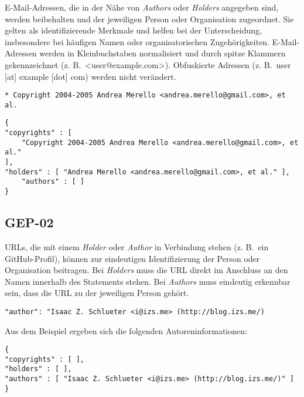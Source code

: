 E-Mail-Adressen, die in der Nähe von \textit{Authors} oder \textit{Holders} angegeben sind, werden beibehalten und der jeweiligen Person oder Organisation zugeordnet.
Sie gelten als identifizierende Merkmale und helfen bei der Unterscheidung, insbesondere bei häufigen Namen oder organisatorischen Zugehörigkeiten.
E-Mail-Adressen werden in Kleinbuchstaben normalisiert und durch spitze Klammern gekennzeichnet (z. B.\ <user@example.com>).
Obfuskierte Adressen (z. B.\ user [at] example [dot] com) werden nicht verändert.

\begin{lstlisting}[keepspaces=true]
* Copyright 2004-2005 Andrea Merello <andrea.merello@gmail.com>, et al.
\end{lstlisting}

\begin{lstlisting}[keepspaces=true]
{
"copyrights" : [
    "Copyright 2004-2005 Andrea Merello <andrea.merello@gmail.com>, et al."
],
"holders" : [ "Andrea Merello <andrea.merello@gmail.com>, et al." ],
    "authors" : [ ]
}
\end{lstlisting}


\subsection{GEP-02}\label{subsec:gep-02}

URLs, die mit einem \textit{Holder} oder \textit{Author} in Verbindung stehen (z. B.\ ein GitHub-Profil), können zur eindeutigen Identifizierung der Person oder Organisation beitragen.
Bei \textit{Holders} muss die URL direkt im Anschluss an den Namen innerhalb des Statements stehen.
Bei \textit{Authors} muss eindeutig erkennbar sein, dass die URL zu der jeweiligen Person gehört.

\begin{lstlisting}[keepspaces=true]
"author": "Isaac Z. Schlueter <i@izs.me> (http://blog.izs.me/)
\end{lstlisting}

Aus dem Beispiel ergeben sich die folgenden Autoreninformationen:

\begin{lstlisting}[keepspaces=true]
{
"copyrights" : [ ],
"holders" : [ ],
"authors" : [ "Isaac Z. Schlueter <i@izs.me> (http://blog.izs.me/)" ]
}
\end{lstlisting}

